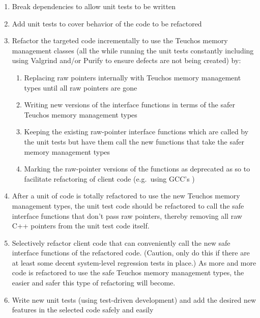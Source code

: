 \documentclass[pdf,ps2pdf,11pt]{SANDreport}
\begin{document}
\begin{enumerate}

{}\item Break dependencies to allow unit tests to be written

{}\item Add unit tests to cover behavior of the code to be refactored

{}\item Refactor the targeted code incrementally to use the Teuchos
memory management classes (all the while running the unit tests
constantly including using Valgrind and/or Purify to ensure defects
are not being created) by:

  \begin{enumerate}

  {}\item Replacing raw pointers internally with Teuchos memory
  management types until all raw pointers are gone

  {}\item Writing new versions of the interface functions in terms of
  the safer Teuchos memory management types

  {}\item Keeping the existing raw-pointer interface functions which
  are called by the unit tests but have them call the new functions
  that take the safer memory management types

  {}\item Marking the raw-pointer versions of the functions as
  deprecated as so to facilitate refactoring of client code (e.g.\
  using GCC's {})

  \end{enumerate}

{}\item After a unit of code is totally refactored to use the new
Teuchos memory management types, the unit test code should be
refactored to call the safe interface functions that don't pass raw
pointers, thereby removing all raw C++ pointers from the unit test
code itself.

{}\item Selectively refactor client code that can conveniently call
the new safe interface functions of the refactored code.  (Caution,
only do this if there are at least some decent system-level regression
tests in place.)  As more and more code is refactored to use the safe
Teuchos memory management types, the easier and safer this type of
refactoring will become.

{}\item Write new unit tests (using test-driven development) and add
the desired new features in the selected code safely and easily

\end{enumerate}
\end{document}
